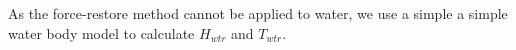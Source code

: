 \documentclass[final,3p,times,authoryear]{elsarticle}
\begin{document}
As the force-restore method cannot be applied to water, we use a simple a simple water body model to calculate $H_{wtr}$ and $T_{wtr}$.
%
%
%
%
%
%
%
%
%
%
\end{document}
